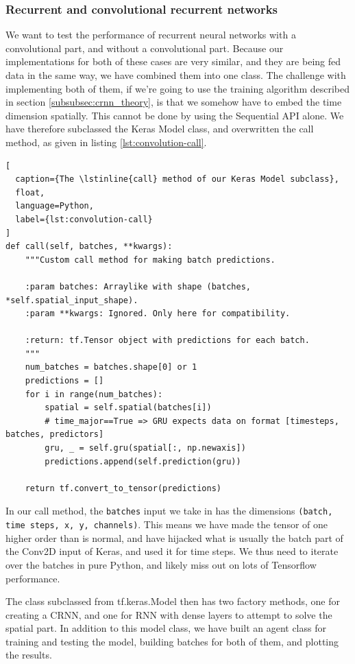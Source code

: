 \documentclass[a4paper]{article}
\begin{document}
\subsubsection{Recurrent and convolutional recurrent networks}

We want to test the performance of recurrent neural networks with a convolutional part, and without a convolutional part. Because our implementations for both of these cases are very similar, and they are being fed data in the same way, we have combined them into one class. The challenge with implementing both of them, if we're going to use the training algorithm described in section \ref{subsubsec:crnn_theory}, is that we somehow have to embed the time dimension spatially. This cannot be done by using the Sequential API alone. We have therefore subclassed the Keras Model class, and overwritten the call method, as given in listing \ref{lst:convolution-call}.

\begin{lstlisting}[
  caption={The \lstinline{call} method of our Keras Model subclass},
  float,
  language=Python,
  label={lst:convolution-call}
]
def call(self, batches, **kwargs):
    """Custom call method for making batch predictions.

    :param batches: Arraylike with shape (batches, *self.spatial_input_shape).
    :param **kwargs: Ignored. Only here for compatibility.

    :return: tf.Tensor object with predictions for each batch.
    """
    num_batches = batches.shape[0] or 1
    predictions = []
    for i in range(num_batches):
        spatial = self.spatial(batches[i])
        # time_major==True => GRU expects data on format [timesteps, batches, predictors]
        gru, _ = self.gru(spatial[:, np.newaxis])
        predictions.append(self.prediction(gru))

    return tf.convert_to_tensor(predictions)
\end{lstlisting}

In our call method, the \lstinline{batches} input we take in has the dimensions \lstinline{(batch, time steps, x, y, channels)}. This means we have made the tensor of one higher order than is normal, and have hijacked what is usually the batch part of the Conv2D input of Keras, and used it for time steps. We thus need to iterate over the batches in pure Python, and likely miss out on lots of Tensorflow performance.

The class subclassed from tf.keras.Model then has two factory methods, one for creating a CRNN, and one for RNN with dense layers to attempt to solve the spatial part. In addition to this model class, we have built an agent class for training and testing the model, building batches for both of them, and plotting the results.
\end{document}
